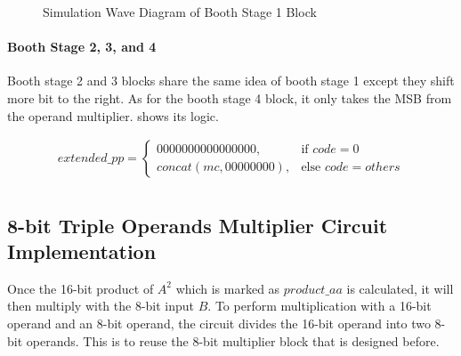 \begin{figure}[!ht]
	\centering
	\caption{Simulation Wave Diagram of Booth Stage 1 Block}

	\hspace{0.5cm}

	\label{fig:booth_stage_1_sim}
\end{figure}

\paragraph{Booth Stage 2, 3, and 4}
Booth stage 2 and 3 blocks share the same idea of booth stage 1 except they shift more bit to the right.
As for the booth stage 4 block, it only takes the MSB from the operand multiplier.  shows its logic.

\begin{equation}
	\begin{array}{c}
		extended\_pp =
		\begin{cases}
			0000000000000000,    & \text{if } code = 0        \\
			concat(mc,00000000), & \text{else } code = others
		\end{cases} \\
	\end{array}
	\label{exp:booth_stage_4}
\end{equation}

\subsection{8-bit Triple Operands Multiplier Circuit Implementation}

Once the 16-bit product of \textbf{\(A^2\)} which is marked as \(product\_aa\) is calculated, it will then multiply with the 8-bit input \(B\).
To perform multiplication with a 16-bit operand and an 8-bit operand, the circuit divides the 16-bit operand into two 8-bit operands.
This is to reuse the 8-bit multiplier block that is designed before.

